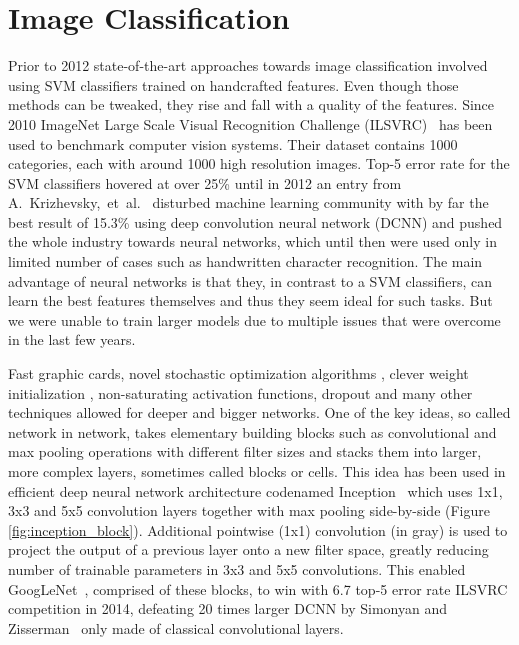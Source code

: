 \section*{Image Classification}
Prior to 2012 state-of-the-art approaches towards image classification involved using SVM classifiers trained on handcrafted features. Even though those methods can be tweaked, they rise and fall with a quality of the features. Since 2010 ImageNet Large Scale Visual Recognition Challenge (ILSVRC)~\cite{ILSVRC15} has been used to benchmark computer vision systems. Their dataset contains 1000 categories, each with around 1000 high resolution images. Top-5 error rate for the SVM classifiers hovered at over 25\% until in 2012 an entry from A.~Krizhevsky,~et~al.~\cite{AlexNet} disturbed machine learning community with by far the best result of 15.3\% using deep convolution neural network (DCNN) and pushed the whole industry towards neural networks, which until then were used only in limited number of cases such as handwritten character recognition. The main advantage of neural networks is that they, in contrast to a SVM classifiers, can learn the best features themselves and thus they seem ideal for such tasks. But we were unable to train larger models due to multiple issues that were overcome in the last few years.

Fast graphic cards, novel stochastic optimization algorithms \cite{kingma2014adam}, clever weight initialization \cite{glorot2010understanding}, non-saturating activation functions, dropout \cite{srivastava2014dropout} and many other techniques allowed for deeper and bigger networks. One of the key ideas, so called network in network, takes elementary building blocks such as convolutional and max pooling operations with different filter sizes and stacks them into larger, more complex layers, sometimes called blocks or cells. This idea has been used in efficient deep neural network architecture codenamed Inception~\cite{szegedy2015going} which uses 1x1, 3x3 and 5x5 convolution layers together with max pooling side-by-side (Figure \ref{fig:inception_block}). Additional pointwise (1x1) convolution (in gray) is used to project the output of a previous layer onto a new filter space, greatly reducing number of trainable parameters in 3x3 and 5x5 convolutions. This enabled GoogLeNet~\cite{szegedy2015going}, comprised of these blocks, to win with 6.7 top-5 error rate ILSVRC competition in 2014, defeating 20 times larger DCNN by Simonyan and Zisserman~\cite{simonyan2014very} only made of classical convolutional layers.

